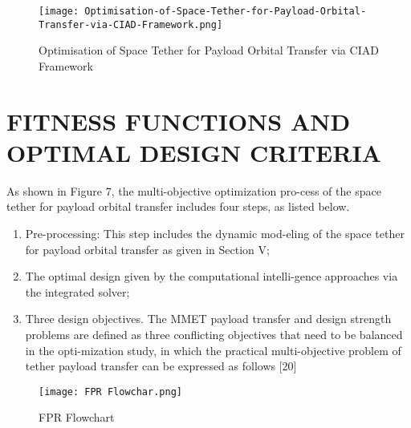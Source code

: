 \documentclass[conference]{IEEEtran}
\begin{document}
\begin{figure}[H]
\centering
\begin{minipage}{0.4\textwidth}
    \texttt{[image: Optimisation-of-Space-Tether-for-Payload-Orbital-Transfer-via-CIAD-Framework.png]}
    \caption{Optimisation of Space Tether for Payload Orbital Transfer via CIAD Framework}
\end{minipage}
\end{figure}

\section{FITNESS FUNCTIONS AND OPTIMAL DESIGN
CRITERIA}
As shown in Figure 7, the multi-objective optimization pro-cess of the space tether for payload orbital transfer includes
four steps, as listed below.
\begin{enumerate}
    \item Pre-processing: This step includes the dynamic mod-eling of the space tether for payload orbital transfer as given in Section V;
    \item The optimal design given by the computational intelli-gence approaches via the integrated solver;
    \item Three design objectives. The MMET payload transfer
and design strength problems are defined as three conflicting objectives that need to be balanced in the opti-mization study, in which the practical multi-objective
problem of tether payload transfer can be expressed as
follows [20]
    
\end{enumerate}

\begin{figure}[H]
\centering
\begin{minipage}{0.4\textwidth}
    \texttt{[image: FPR Flowchar.png]}
    \caption{FPR Flowchart}
\end{minipage}
\end{figure}
\end{document}
